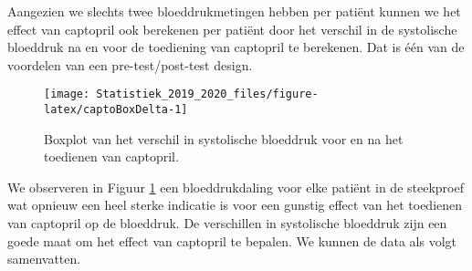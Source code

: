 \documentclass[12pt,dutch,coursenotes]{book}
\newenvironment{Shaded}{\begin{snugshade}}{\end{snugshade}}
\newcommand{\KeywordTok}[1]{\textcolor[rgb]{0.13,0.29,0.53}{\textbf{#1}}}
\newcommand{\DataTypeTok}[1]{\textcolor[rgb]{0.13,0.29,0.53}{#1}}
\newcommand{\DecValTok}[1]{\textcolor[rgb]{0.00,0.00,0.81}{#1}}
\newcommand{\StringTok}[1]{\textcolor[rgb]{0.31,0.60,0.02}{#1}}
\newcommand{\CommentTok}[1]{\textcolor[rgb]{0.56,0.35,0.01}{\textit{#1}}}
\newcommand{\OtherTok}[1]{\textcolor[rgb]{0.56,0.35,0.01}{#1}}
\newcommand{\OperatorTok}[1]{\textcolor[rgb]{0.81,0.36,0.00}{\textbf{#1}}}
\newcommand{\NormalTok}[1]{#1}
\theoremstyle{definition}
\theoremstyle{definition}
\theoremstyle{definition}
\theoremstyle{remark}
\begin{document}
Aangezien we slechts twee bloeddrukmetingen hebben per patiënt kunnen we
het effect van captopril ook berekenen per patiënt door het verschil in
de systolische bloeddruk na en voor de toediening van captopril te
berekenen. Dat is één van de voordelen van een pre-test/post-test
design.

\begin{Shaded}
\end{Shaded}

\begin{figure}

{\centering \texttt{[image: Statistiek\_2019\_2020\_files/figure-latex/captoBoxDelta-1]} 

}

\caption{Boxplot van het verschil in systolische bloeddruk voor en na het toedienen van captopril.}\label{fig:captoBoxDelta}
\end{figure}

We observeren in Figuur \ref{fig:captoBoxDelta} een bloeddrukdaling voor
elke patiënt in de steekproef wat opnieuw een heel sterke indicatie is
voor een gunstig effect van het toedienen van captopril op de bloeddruk.
De verschillen in systolische bloeddruk zijn een goede maat om het
effect van captopril te bepalen. We kunnen de data als volgt
samenvatten.
\end{document}
